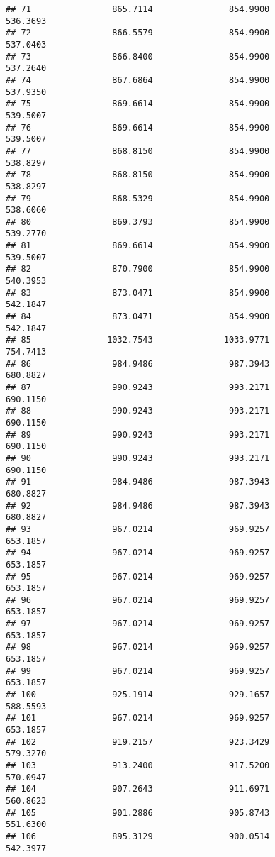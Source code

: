 \documentclass[]{article}
\begin{document}
\begin{verbatim}
## 71                865.7114               854.9900            536.3693
## 72                866.5579               854.9900            537.0403
## 73                866.8400               854.9900            537.2640
## 74                867.6864               854.9900            537.9350
## 75                869.6614               854.9900            539.5007
## 76                869.6614               854.9900            539.5007
## 77                868.8150               854.9900            538.8297
## 78                868.8150               854.9900            538.8297
## 79                868.5329               854.9900            538.6060
## 80                869.3793               854.9900            539.2770
## 81                869.6614               854.9900            539.5007
## 82                870.7900               854.9900            540.3953
## 83                873.0471               854.9900            542.1847
## 84                873.0471               854.9900            542.1847
## 85               1032.7543              1033.9771            754.7413
## 86                984.9486               987.3943            680.8827
## 87                990.9243               993.2171            690.1150
## 88                990.9243               993.2171            690.1150
## 89                990.9243               993.2171            690.1150
## 90                990.9243               993.2171            690.1150
## 91                984.9486               987.3943            680.8827
## 92                984.9486               987.3943            680.8827
## 93                967.0214               969.9257            653.1857
## 94                967.0214               969.9257            653.1857
## 95                967.0214               969.9257            653.1857
## 96                967.0214               969.9257            653.1857
## 97                967.0214               969.9257            653.1857
## 98                967.0214               969.9257            653.1857
## 99                967.0214               969.9257            653.1857
## 100               925.1914               929.1657            588.5593
## 101               967.0214               969.9257            653.1857
## 102               919.2157               923.3429            579.3270
## 103               913.2400               917.5200            570.0947
## 104               907.2643               911.6971            560.8623
## 105               901.2886               905.8743            551.6300
## 106               895.3129               900.0514            542.3977

\end{verbatim}
\end{document}
